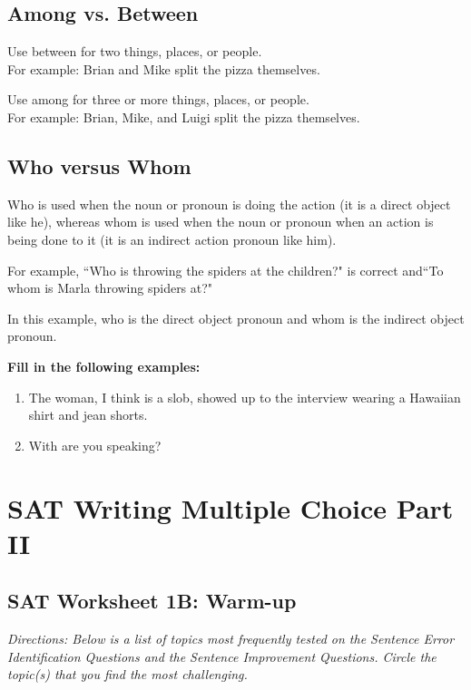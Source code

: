 \documentclass[12pt]{book}
\newcommand{\longline}{\underline{\hspace{2in}} }
\begin{document}
\vfill
\section{Among vs. Between}
Use between for two things, places, or people.\\
For example: Brian and Mike split the pizza \longline themselves.

\bigskip
Use among for three or more things, places, or people.\\
For example:  Brian, Mike, and Luigi split the pizza \longline  themselves.

\vfill
\section{Who versus Whom}
Who is used when the noun or pronoun is doing the action (it is a direct object like he), whereas whom is used when the noun or pronoun when an action is being done to it (it is an indirect action pronoun like him).

\bigskip
For example, ``Who is throwing the spiders at the children?" is correct and``To whom is Marla throwing spiders at?"

\bigskip
In this example, who is the direct object pronoun and whom is the indirect object pronoun.

\bigskip
\textbf{Fill in the following examples:}

\begin{enumerate}
\item{The woman, \longline I think is a slob, showed up to the interview wearing a Hawaiian shirt and jean shorts. }
\item{With \longline are you speaking?}
\end{enumerate}

\vfill
\chapter[Multiple Choice PartII]{SAT Writing Multiple Choice Part II}
\section{SAT Worksheet 1B: Warm-up}
\textit{Directions: Below is a list of topics most frequently tested on the Sentence Error Identification Questions and the Sentence Improvement Questions. Circle the topic(s) that you find the most challenging.} 
\end{document}
